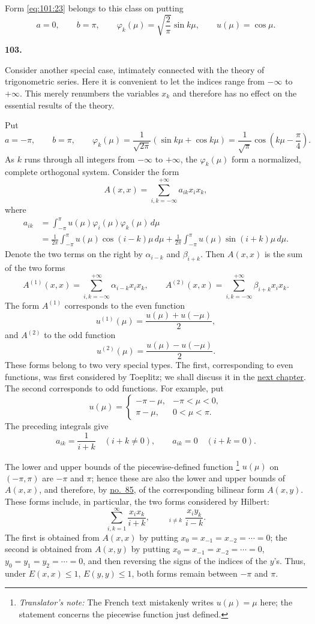 \documentclass[
  paper=b5,
  fontsize=13pt,
  twoside=true,
  open=any,
  bookmarkpackage=false,
  chapterprefix=true,
  headings=normal
]{scrbook}
\theoremstyle{definition}
\newcommand{\numberedparagraph}[1]{%
  \par\medskip\phantomsection\label{sec:#1}%
  \noindent\textbf{#1.}\enspace
}
\newcounter{translatornote}
\newcommand{\translatornotelabel}{T\arabic{translatornote}}
\newcommand{\translatornote}[1]{%
  \stepcounter{translatornote}%
  \begingroup
    \edef\savedfootnotenumber{\number\value{footnote}}%
    \renewcommand{\thefootnote}{\translatornotelabel}%
    \footnote{\emph{Translator's note:} #1}%
    \setcounter{footnote}{\savedfootnotenumber}%
  \endgroup
}
\begin{document}
Form \eqref{eq:101:23} belongs to this class on putting
\[
  a=0,\qquad b=\pi,\qquad
  \varphi_k(\mu)=\sqrt{\frac2\pi}\sin k\mu,\qquad u(\mu)=\cos\mu.
\]

\numberedparagraph{103}
Consider another special case, intimately connected with the theory of
trigonometric series.  Here it is convenient to let the indices range from
\(-\infty\) to \(+\infty\).  This merely renumbers the variables \(x_k\) and
therefore has no effect on the essential results of the theory.

Put
\[
  a=-\pi,\qquad b=\pi,\qquad
  \varphi_k(\mu)=\frac{1}{\sqrt{2\pi}}(\sin k\mu+\cos k\mu)
  =\frac1{\sqrt\pi}\cos\left(k\mu-\frac\pi4\right).
\]
As \(k\) runs through all integers from \(-\infty\) to \(+\infty\), the
\(\varphi_k(\mu)\) form a normalized, complete orthogonal system.  Consider
the form
\[
  A(x,x)=\sum_{i,k=-\infty}^{+\infty}a_{ik}x_ix_k,
\]
where
\begin{align*}
  a_{ik}
  &=\int_{-\pi}^{\pi}u(\mu)\varphi_i(\mu)\varphi_k(\mu)\,d\mu\\
  &=\frac1{2\pi}\int_{-\pi}^{\pi}u(\mu)\cos(i-k)\mu\,d\mu
   +\frac1{2\pi}\int_{-\pi}^{\pi}u(\mu)\sin(i+k)\mu\,d\mu.
\end{align*}
Denote the two terms on the right by \(\alpha_{i-k}\) and \(\beta_{i+k}\).
Then \(A(x,x)\) is the sum of the two forms
\[
  A^{(1)}(x,x)=\sum_{i,k=-\infty}^{+\infty}\alpha_{i-k}x_ix_k,
  \qquad
  A^{(2)}(x,x)=\sum_{i,k=-\infty}^{+\infty}\beta_{i+k}x_ix_k.
\]
The form \(A^{(1)}\) corresponds to the even function
\[
  u^{(1)}(\mu)=\frac{u(\mu)+u(-\mu)}2,
\]
and \(A^{(2)}\) to the odd function
\[
  u^{(2)}(\mu)=\frac{u(\mu)-u(-\mu)}2.
\]
These forms belong to two very special types.  The first, corresponding to
even functions, was first considered by Toeplitz; we shall discuss it in the
\hyperref[chap:6]{next chapter}.  The second corresponds to odd functions.  For example, put
\[
  u(\mu)=
  \begin{cases}
    -\pi-\mu,&-\pi<\mu<0,\\
    \pi-\mu,&0<\mu<\pi.
  \end{cases}
\]
The preceding integrals give
\[
  a_{ik}=\frac1{i+k}\quad(i+k\ne0),
  \qquad a_{ik}=0\quad(i+k=0).
\]

The lower and upper bounds of the piecewise-defined function\translatornote{The French text
mistakenly writes \(u(\mu)=\mu\) here; the statement concerns the piecewise
function just defined.} \(u(\mu)\) on \((-\pi,\pi)\) are \(-\pi\) and
\(\pi\); hence these are also the
lower and upper bounds of \(A(x,x)\), and therefore, by
\hyperref[sec:85]{no.~85}, of the corresponding bilinear form
\(A(x,y)\).  These forms include, in particular, the two forms considered by
Hilbert:
\[
  \sum_{i,k=1}^{\infty}\frac{x_ix_k}{i+k},
  \qquad
  \mathop{\sum_{i,k=1}^{\infty}}_{i\ne k}\frac{x_iy_k}{i-k}.
\]
The first is obtained from \(A(x,x)\) by putting
\(x_0=x_{-1}=x_{-2}=\cdots=0\); the second
is obtained from \(A(x,y)\) by putting
\(x_0=x_{-1}=x_{-2}=\cdots=0\),
\(y_0=y_1=y_2=\cdots=0\), and then reversing the signs of the indices of the
\(y\)'s.  Thus, under \(E(x,x)\le1\), \(E(y,y)\le1\), both forms remain
between \(-\pi\) and \(\pi\).
\end{document}
